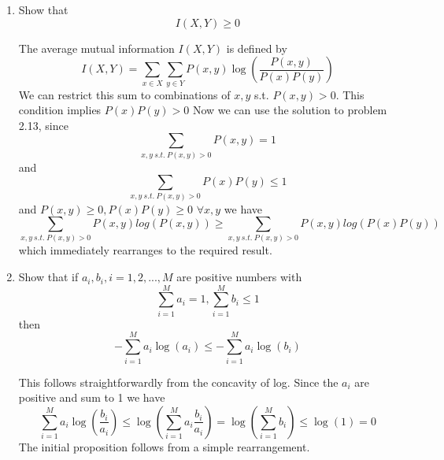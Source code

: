 \documentclass{article}
\newcommand{\chapternumber}{2}
\newenvironment{QandA}{\begin{enumerate}[label=\chapternumber.\arabic*]\bfseries\boldmath}
	{\end{enumerate}}
\newenvironment{answered}{\par\bigskip\normalfont\unboldmath}{}
\begin{document}
\begin{QandA}
	\item Show that 
	\[I(X,Y)\geq 0\]
	\begin{answered}
		The average mutual information $I(X,Y)$ is defined by
		\[I(X,Y)=\sum_{x\in X}\sum_{y\in Y}P(x,y)\log\left(\frac{P(x,y)}{P(x)P(y)}\right)\]
		We can restrict this sum to combinations of $x,y$ s.t. $P(x,y)>0$. This condition implies $P(x)P(y)>0$
		Now we can use the solution to problem 2.13, since 
		\[\sum_{x,y\ s.t.\ P(x,y)>0}P(x,y)=1\]
		and
		\[\sum_{x,y\ s.t.\ P(x,y)>0}P(x)P(y)\leq1\]
		and $P(x,y)\geq 0,P(x)P(y)\geq0$ $\forall x,y$
		we have
		\[\sum_{x,y\ s.t.\ P(x,y)>0}P(x,y)log(P(x,y))\geq \sum_{x,y\ s.t.\ P(x,y)>0}P(x,y)log(P(x)P(y))\]
		which immediately rearranges to the required result.
	\end{answered}

	\item Show that if $a_i,b_i,i=1,2,...,M$ are positive numbers with
	\[\sum_{i=1}^Ma_i=1,\sum_{i=1}^Mb_i\leq1\]
	then
	\[-\sum_{i=1}^Ma_i\log(a_i)\leq-\sum_{i=1}^Ma_i\log(b_i)\]
	\begin{answered}
		This follows straightforwardly from the concavity of log. Since the $a_i$ are positive and sum to 1 we have
	\[\sum_{i=1}^Ma_i\log\left(\frac{b_i}{a_i}\right)\leq \log\left(\sum_{i=1}^Ma_i\frac{b_i}{a_i}\right)=\log\left(\sum_{i=1}^Mb_i\right)\leq \log(1)=0\]
	The initial proposition follows from a simple rearrangement.
	\end{answered}



\end{QandA}
\end{document}
